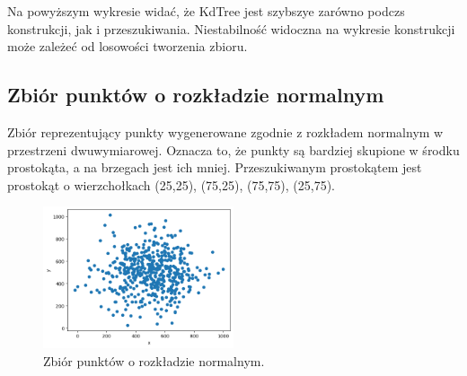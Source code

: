 \documentclass{lab}
\begin{document}
Na powyższym wykresie widać, że KdTree jest szybszye zarówno podczs konstrukcji, jak i przeszukiwania. Niestabilność widoczna na wykresie konstrukcji może zależeć od losowości tworzenia zbioru.

\newpage
\subsection{Zbiór punktów o rozkładzie normalnym}
Zbiór reprezentujący punkty wygenerowane zgodnie z rozkładem normalnym w przestrzeni dwuwymiarowej.
Oznacza to, że punkty są bardziej skupione w środku prostokąta, a na brzegach jest ich mniej.
Przeszukiwanym prostokątem jest prostokąt o wierzchołkach (25,25), (75,25), (75,75), (25,75).

\begin{figure}[H]
  \centering
  \includegraphics[width=0.5\textwidth]{resources/normal.png}
  \caption{Zbiór punktów o rozkładzie normalnym.}
  \label{fig:normal}
\end{figure}
\end{document}
